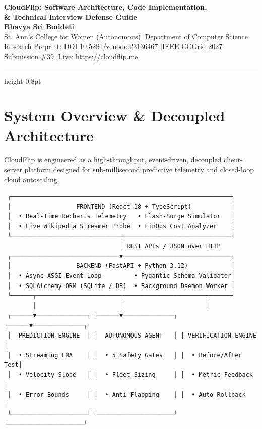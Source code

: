 \documentclass[11pt,letterpaper]{article}
\begin{document}
\begin{center}
  {\LARGE \textbf{CloudFlip: Software Architecture, Code Implementation,}}\\[4pt]
  {\LARGE \textbf{\& Technical Interview Defense Guide}}\\[6pt]
  {\large \textbf{Bhavya Sri Boddeti}} \\[2pt]
  {\small St. Ann's College for Women (Autonomous) \quad$|$\quad Department of Computer Science} \\[2pt]
  {\small Research Preprint: DOI \href{https://doi.org/10.5281/zenodo.23136467}{10.5281/zenodo.23136467} \quad$|$\quad IEEE CCGrid 2027 Submission \#39 \quad$|$\quad Live: \url{https://cloudflip.me}}
\end{center}

\vspace{2pt}
\hrule height 0.8pt
\vspace{8pt}

\section{System Overview \& Decoupled Architecture}
CloudFlip is engineered as a high-throughput, event-driven, decoupled client-server platform designed for sub-millisecond predictive telemetry and closed-loop cloud autoscaling.

\begin{tcolorbox}[title=High-Level Component Interaction Flow, colback=blue!2!white, colframe=boxblue]
\begin{verbatim}
 ┌─────────────────────────────────────────────────────────────┐
 │                  FRONTEND (React 18 + TypeScript)           │
 │  • Real-Time Recharts Telemetry   • Flash-Surge Simulator   │
 │  • Live Wikipedia Streamer Probe  • FinOps Cost Analyzer    │
 └──────────────────────────────┬──────────────────────────────┘
                                │ REST APIs / JSON over HTTP
 ┌──────────────────────────────▼──────────────────────────────┐
 │                  BACKEND (FastAPI + Python 3.12)            │
 │  • Async ASGI Event Loop         • Pydantic Schema Validator│
 │  • SQLAlchemy ORM (SQLite / DB)  • Background Daemon Worker │
 └──────┬───────────────────────┬───────────────────────┬──────┘
        │                       │                       │
 ┌──────▼──────────────┐ ┌──────▼──────────────┐ ┌──────▼──────────────┐
 │  PREDICTION ENGINE  │ │  AUTONOMOUS AGENT   │ │ VERIFICATION ENGINE │
 │  • Streaming EMA    │ │  • 5 Safety Gates   │ │  • Before/After Test│
 │  • Velocity Slope   │ │  • Fleet Sizing     │ │  • Metric Feedback  │
 │  • Error Bounds     │ │  • Anti-Flapping    │ │  • Auto-Rollback    │
 └─────────────────────┘ └─────────────────────┘ └─────────────────────┘
\end{verbatim}
\end{tcolorbox}
\end{document}

